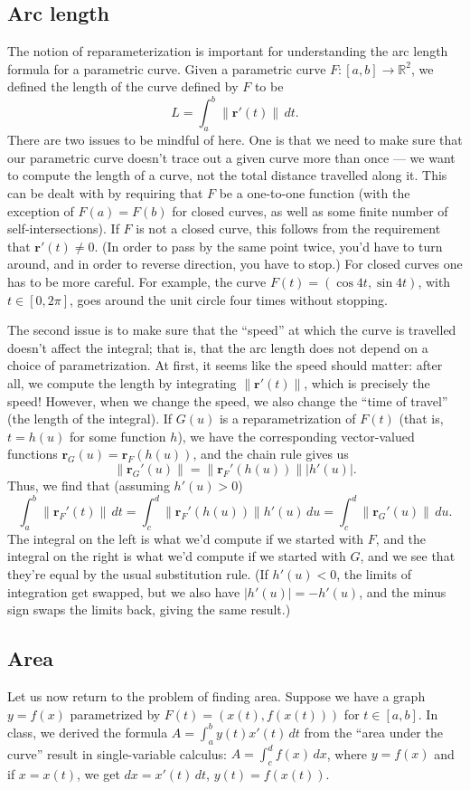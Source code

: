 \documentclass[letterpaper,12pt]{article}
\newcommand{\abs}[1]{\lvert #1\rvert}
\newcommand{\len}[1]{\lVert #1\rVert}
\renewcommand{\r}{\mathbf{r}}
\newcommand{\R}{\mathbb{R}}
\newcommand{\di}{\displaystyle}
\begin{document}
\subsection{Arc length}
The notion of reparameterization is important for understanding the arc length formula for a parametric curve. Given a parametric curve $F:[a,b]\to\R^2$, we defined the length of the curve defined by $F$ to be
\[
 L = \int_a^b\len{\r'(t)}\,dt.
\]
There are two issues to be mindful of here. One is that we need to make sure that our parametric curve doesn't trace out a given curve more than once --- we want to compute the length of a curve, not the total distance travelled along it. This can be dealt with by requiring that $F$ be a one-to-one function (with the exception of $F(a)=F(b)$ for closed curves, as well as some finite number of self-intersections). If $F$ is not a closed curve, this follows from the requirement that $\r'(t)\neq 0$. (In order to pass by the same point twice, you'd have to turn around, and in order to reverse direction, you have to stop.) For closed curves one has to be more careful. For example, the curve $F(t)=(\cos 4t, \sin 4t)$, with $t\in [0,2\pi]$, goes around the unit circle four times without stopping. 

The second issue is to make sure that the ``speed'' at which the curve is travelled doesn't affect the integral; that is, that the arc length does not depend on a choice of parametrization. At first, it seems like the speed should matter: after all, we compute the length by integrating $\len{\r'(t)}$, which is precisely the speed! However, when we change the speed, we also change the ``time of travel'' (the length of the integral). If $G(u)$ is a reparametrization of $F(t)$ (that is, $t=h(u)$ for some function $h$), we have the corresponding vector-valued functions $\r_G(u) = \r_F(h(u))$, and the chain rule gives us
\[
 \len{\r_G'(u)} = \len{\r_F'(h(u))}\abs{h'(u)}.
\]
Thus, we find that (assuming $h'(u)>0$)
\[
 \int_a^b\len{\r_F'(t)}\,dt = \int_c^d\len{\r_F'(h(u))}h'(u)\,du = \int_c^d\len{\r_G'(u)}\, du.
\]
The integral on the left is what we'd compute if we started with $F$, and the integral on the right is what we'd compute if we started with $G$, and we see that they're equal by the usual substitution rule. (If $h'(u)<0$, the limits of integration get swapped, but we also have $\abs{h'(u)}=-h'(u)$, and the minus sign swaps the limits back, giving the same result.)
\subsection{Area}
Let us now return to the problem of finding area. Suppose we have a graph $y=f(x)$ parametrized by $F(t) = (x(t),f(x(t)))$ for $t\in [a,b]$. In class, we derived the formula $\di A=\int_a^b y(t)x'(t)\,dt$ from the ``area under the curve'' result in single-variable calculus: $\di A = \int_c^d f(x)\,dx$, where $y=f(x)$ and if $x=x(t)$, we get $dx = x'(t)\,dt$, $y(t) = f(x(t))$. 
\end{document}
